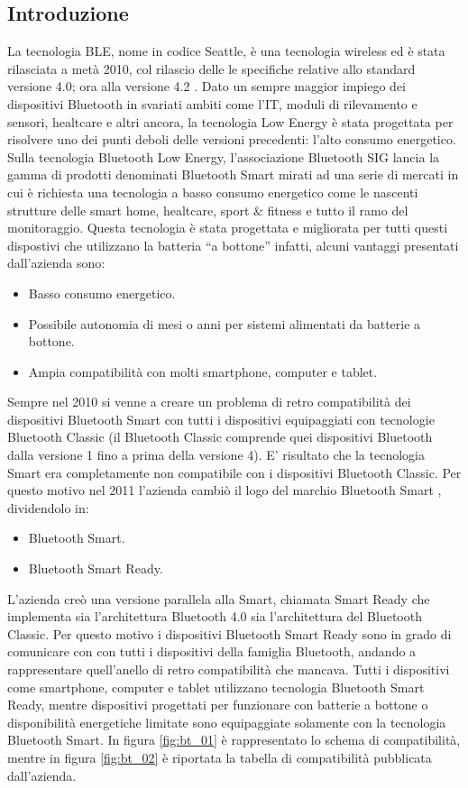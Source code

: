  \subsection{Introduzione}
La tecnologia \acf{BLE}, nome in codice Seattle, è una tecnologia wireless ed è stata rilasciata a metà 2010, col rilascio delle le specifiche relative allo standard versione 4.0; ora alla versione 4.2 \cite{BT-CoreSpec4.0} . Dato un sempre maggior impiego dei dispositivi Bluetooth in svariati ambiti come l'IT, moduli di rilevamento e sensori, healtcare \cite{BT-SmartMarks} e altri ancora, la tecnologia Low Energy è stata progettata per risolvere uno dei punti deboli delle versioni precedenti: l'alto consumo energetico. Sulla tecnologia Bluetooth Low Energy, l'associazione Bluetooth SIG lancia la gamma di prodotti denominati Bluetooth Smart mirati ad una serie di mercati in cui è richiesta una tecnologia a basso consumo energetico come le nascenti strutture delle smart home, healtcare, sport \& fitness e tutto il ramo del monitoraggio. Questa tecnologia è stata progettata e migliorata per tutti questi dispostivi che utilizzano la batteria “a bottone” infatti, alcuni vantaggi presentati dall'azienda sono:
\begin{itemize}
	\item Basso consumo energetico.
	\item Possibile autonomia di mesi o anni per sistemi alimentati da batterie a bottone.
	\item Ampia compatibilità con molti smartphone, computer e tablet.
\end{itemize}
 Sempre nel 2010 si venne a creare un problema di retro compatibilità dei dispositivi Bluetooth Smart con tutti i dispositivi equipaggiati con tecnologie Bluetooth Classic (il Bluetooth Classic comprende quei dispositivi Bluetooth dalla versione 1 fino a prima della versione 4). E' risultato che la tecnologia Smart era completamente non compatibile con i dispositivi Bluetooth Classic. Per questo motivo nel 2011 l'azienda cambiò il logo del marchio Bluetooth Smart \cite{BT-Brand}, dividendolo in:
 \begin{itemize}
 	\item Bluetooth Smart.
 	\item Bluetooth Smart Ready.
 \end{itemize}
 L'azienda creò una versione parallela alla Smart, chiamata Smart Ready che implementa sia l'architettura Bluetooth 4.0 sia l'architettura del Bluetooth Classic. Per questo motivo i dispositivi Bluetooth Smart Ready sono in grado di comunicare con con tutti i dispositivi della famiglia Bluetooth, andando a rappresentare quell'anello di retro compatibilità che mancava. Tutti i dispositivi come smartphone, computer e tablet utilizzano tecnologia Bluetooth Smart Ready, mentre dispositivi progettati per funzionare con batterie a bottone o disponibilità energetiche limitate sono equipaggiate solamente con la tecnologia Bluetooth Smart. In figura \ref{fig:bt_01} è rappresentato lo schema di compatibilità, mentre in figura \ref{fig:bt_02} è riportata la tabella di compatibilità pubblicata dall'azienda. 
 
